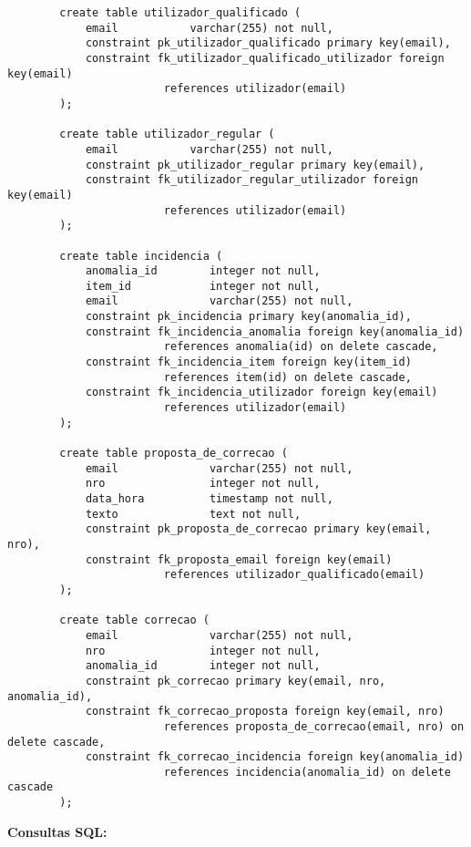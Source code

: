 \documentclass[12pt]{report}
\begin{document}
\begin{verbatim}
        create table utilizador_qualificado (
            email           varchar(255) not null,
            constraint pk_utilizador_qualificado primary key(email),
            constraint fk_utilizador_qualificado_utilizador foreign key(email)
                        references utilizador(email)
        );

        create table utilizador_regular (
            email           varchar(255) not null,
            constraint pk_utilizador_regular primary key(email),
            constraint fk_utilizador_regular_utilizador foreign key(email)
                        references utilizador(email)
        );

        create table incidencia (
            anomalia_id        integer not null,
            item_id            integer not null,
            email              varchar(255) not null,
            constraint pk_incidencia primary key(anomalia_id),
            constraint fk_incidencia_anomalia foreign key(anomalia_id)
                        references anomalia(id) on delete cascade,
            constraint fk_incidencia_item foreign key(item_id)
                        references item(id) on delete cascade,
            constraint fk_incidencia_utilizador foreign key(email)
                        references utilizador(email)
        );

        create table proposta_de_correcao (
            email              varchar(255) not null,
            nro                integer not null,
            data_hora          timestamp not null,
            texto              text not null,
            constraint pk_proposta_de_correcao primary key(email, nro),
            constraint fk_proposta_email foreign key(email)
                        references utilizador_qualificado(email)
        );

        create table correcao (
            email              varchar(255) not null,
            nro                integer not null,
            anomalia_id        integer not null,
            constraint pk_correcao primary key(email, nro, anomalia_id),
            constraint fk_correcao_proposta foreign key(email, nro)
                        references proposta_de_correcao(email, nro) on delete cascade,
            constraint fk_correcao_incidencia foreign key(anomalia_id)
                        references incidencia(anomalia_id) on delete cascade
        );
    \end{verbatim}

    \Large
    \textbf{Consultas SQL:}
\end{document}
